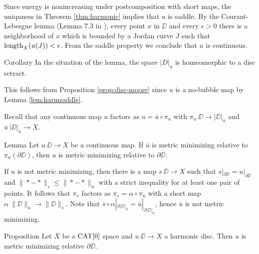 \documentclass[a4paper,10pt]{amsart}
\begin{document}
Since energy is nonincreasing under postcomposition with short maps, the uniquness in Theorem \ref{thm:harmonic} implies that
$u$ is saddle. By the Courant-Lebesgue lemma (Lemma 7.3 in \cite{LW}), every point $x$ in $\DD$ and every $\epsilon>0$
there is a neighborhood of $x$ which is bounded by a Jordan curve $J$ such that $\mathop{\rm length}\nolimits_X(u(J))<\epsilon$. From the saddle property we conclude 
that $u$ is continuous.
\qeds

\begin{thm}{Corollary}\label{cor:harmdiscretract}
In the situation of the lemma, the space $|D|_u$ is homeomorphic to a disc retract.
\end{thm}
This follows from Proposition \ref{prop:disc-moore} since $u$ is a no-bubble map by Lemma \ref{lem:harmsaddle}.
\qeds

Recall that any continuous map $u$ factors as $u=\bar u\circ \pi_u$ with $\pi_u\:\DD\to|\DD|_u$ and $\bar u\:|\DD|_u\to X$.


\begin{thm}{Lemma}\label{lem:memicrit}
Let $u\:\DD\to X$ be a continuous map. 
If $\bar u$ is metric minimizing relative to $\pi_u(\partial\DD)$, then $u$ is metric minimizing relative to $\partial\DD$.
\end{thm}

If $u$ is not metric minimizing, then there is a map $s\:\DD\to X$ such that $s|_{\partial\DD}=u|_{\partial\DD}$ and $\|*-*\|_s\leq \|*-*\|_u$
with a strict inequality for at least one pair of points. It follows that $\pi_s$ factors as $\pi_s=\alpha\circ\pi_u$ with a short  map $\alpha\:\|\DD\|_u\to\|\DD\|_s$.
Note that $\bar s\circ\alpha|_{\partial|\DD|_u}=\bar u|_{\partial|\DD|_u}$, hence $\bar u$ is not metric minimizing.
\qeds







 \begin{thm}{Proposition}\label{prop:harmonic}
Let $X$ be a $\mathop{\rm CAT}\nolimits[0]$ space 
and $u\:\DD\to X$ a harmonic disc.
Then $u$ is metric minimizing relative $\partial\DD$.
\end{thm}
\end{document}
